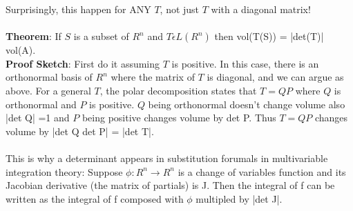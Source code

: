 \documentclass{article}
\begin{document}
Surprisingly, this happen for ANY $T$, not just $T$ with a diagonal matrix! \\\\ 
\textbf{Theorem}: If $S$ is a subset of $R^n$ and $T \epsilon L(R^n)$ then vol(T(S)) = |det(T)| vol(A). \\
\textbf{Proof Sketch}: First do it assuming $T$ is positive. In this case, there is an orthonormal basis of $R^n$ where the matrix of $T$ is diagonal, and we can argue as above. For a general $T$, the polar decomposition states that $T = QP$ where $Q$ is orthonormal and $P$ is positive. $Q$ being orthonormal doesn't change volume also |det Q| =1 and $P$ being positive changes volume by det P. Thus $T = QP$ changes volume by |det Q det P| = |det T|. \\\\
This is why a determinant appears in substitution forumals in multivariable integration theory: Suppose $\phi: R^n \rightarrow R^n$ is a change of variables function and its Jacobian derivative (the matrix of partials) is J. Then the integral of f can be written as the integral of f composed with $\phi$ multipled by |det J|. 
\end{document}
